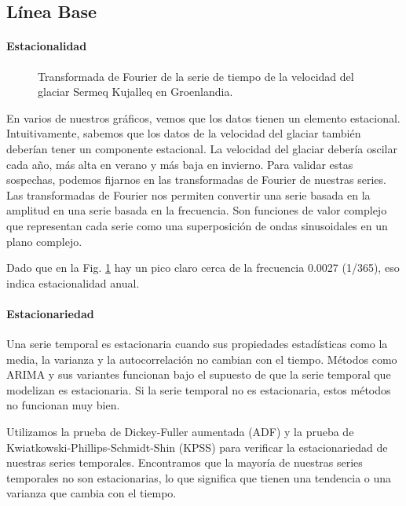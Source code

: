 \documentclass[sigconf,language=spanish]{acmart}
\begin{document}
\subsection{Línea Base}

\paragraph{Estacionalidad}

\begin{figure}[htbp]
   \centering
   
    \caption{Transformada de Fourier de la serie de tiempo de la velocidad del glaciar Sermeq Kujalleq en Groenlandia.}
    \label{fig:frequencies}
\end{figure}

En varios de nuestros gráficos, vemos que los datos tienen un elemento estacional. Intuitivamente, sabemos que los datos de la velocidad del glaciar también deberían tener un componente estacional. La velocidad del glaciar debería oscilar cada año, más alta en verano y más baja en invierno. 
Para validar estas sospechas, podemos fijarnos en las transformadas de Fourier de nuestras series.
Las transformadas de Fourier nos permiten convertir una serie basada en la amplitud en una serie basada en la frecuencia. Son funciones de valor complejo que representan cada serie como una superposición de ondas sinusoidales en un plano complejo.

Dado que en la Fig. \ref{fig:frequencies} hay un pico claro cerca de la frecuencia 0.0027 (1/365), eso indica estacionalidad anual.


\paragraph{Estacionariedad}

Una serie temporal es estacionaria cuando sus propiedades estadísticas como la media, la varianza y la autocorrelación no cambian con el tiempo.
Métodos como ARIMA y sus variantes funcionan bajo el supuesto de que la serie temporal que modelizan es estacionaria. Si la serie temporal no es estacionaria, estos métodos no funcionan muy bien.

Utilizamos la prueba de Dickey-Fuller aumentada (ADF) y la prueba de Kwiatkowski-Phillips-Schmidt-Shin (KPSS) para verificar la estacionariedad de nuestras series temporales.
Encontramos que la mayoría de nuestras series temporales no son estacionarias, lo que significa que tienen una tendencia o una varianza que cambia con el tiempo.
\end{document}
